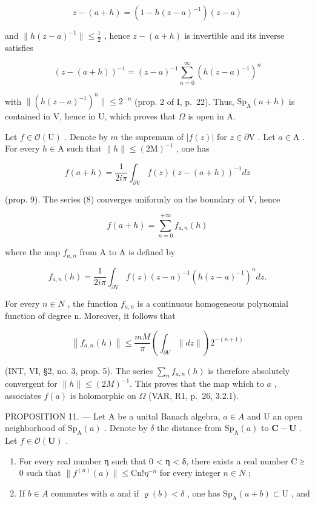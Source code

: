\[
z - (a + h) = (1 - h (z - a) ^ {- 1}) (z - a)
\]

and \(\|h(z-a)^{-1}\|\leqslant\frac{1}{2}\) , hence \(z-(a+h)\) is invertible and its inverse satisfies

\[
(z - (a + h)) ^ {- 1} = (z - a) ^ {- 1} \sum_ {n = 0} ^ {\infty} (h (z - a) ^ {- 1}) ^ {n}\tag{8}
\]

with \(\| (h(z - a)^{-1})^n\| \leqslant 2^{-n}\) (prop. 2 of I, p.~22). Thus, \(\mathrm{Sp}_{\mathrm{A}}(a + h)\) is contained in V, hence in U, which proves that \(\Omega\) is open in A.

Let \(f \in \mathcal{O}(\mathrm{U})\) . Denote by \(m\) the supremum of \(|f(z)|\) for \(z \in \partial \mathrm{V}\) . Let \(a \in \mathrm{A}\) . For every \(h \in \mathrm{A}\) such that \(\| h \| \leqslant (2\mathrm{M})^{-1}\) , one has

\[
f (a + h) = \frac {1}{2 i \pi} \int_ {\partial \mathrm{V}} f (z) (z - (a + h)) ^ {- 1} d z
\]

(prop. 9). The series (8) converges uniformly on the boundary of V, hence

\[
f (a + h) = \sum_ {n = 0} ^ {+ \infty} f _ {a, n} (h)
\]

where the map \(f_{a,n}\) from A to A is defined by

\[
f _ {a, n} (h) = \frac {1}{2 i \pi} \int_ {\partial \mathrm{V}} f (z) (z - a) ^ {- 1} (h (z - a) ^ {- 1}) ^ {n} d z.
\]

For every \(n \in N\) , the function \(f_{a,n}\) is a continuous homogeneous polynomial function of degree n. Moreover, it follows that

\[
\left\| f _ {a, n} (h) \right\| \leqslant \frac {m M}{\pi} \left(\int_ {\partial V} \| d z \|\right) 2 ^ {- (n + 1)}
\]

(INT, VI, §2, no. 3, prop. 5). The series \(\sum_{n} f_{a,n}(h)\) is therefore absolutely convergent for \(\|h\| \leqslant (2M)^{-1}\). This proves that the map which to \(a\) , associates \(f(a)\) is holomorphic on \(\Omega\) (VAR, R1, p.~26, 3.2.1).

PROPOSITION 11. --- Let A be a unital Banach algebra, \(a \in A\) and U an open neighborhood of \(\mathrm{Sp}_{\mathrm{A}}(a)\) . Denote by \(\delta\) the distance from \(\mathrm{Sp}_{\mathrm{A}}(a)\) to \(\mathbf{C} - \mathbf{U}\) . Let \(f \in \mathcal{O}(\mathbf{U})\) .

\begin{enumerate}
\def\labelenumi{\alph{enumi})}
\item
  For every real number η such that 0 \textless{} η \textless{} δ, there exists a real number C ≥ 0 such that \(\|f^{(n)}(a)\| \leqslant \mathrm{Cn}!\eta^{-n}\) for every integer \(n \in N\) ;
\item
  If \(b \in A\) commutes with \(a\) and if \(\varrho(b) < \delta\) , one has \(\mathrm{Sp}_{\mathrm{A}}(a + b) \subset \mathrm{U}\) , and
\end{enumerate}

